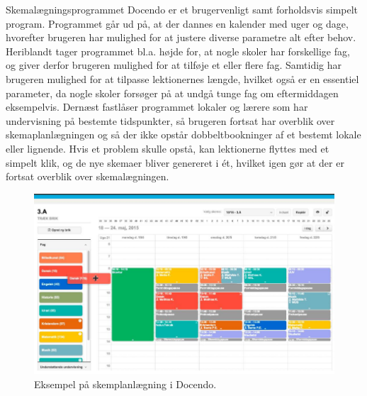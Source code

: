 Skemalægningsprogrammet Docendo er et brugervenligt samt forholdsvis simpelt program. Programmet går ud på, at der dannes en kalender med uger og dage, hvorefter brugeren har mulighed for at justere diverse parametre alt efter behov. Heriblandt tager programmet bl.a. højde for, at nogle skoler har forskellige fag, og giver derfor brugeren mulighed for at tilføje et eller flere fag. Samtidig har brugeren mulighed for at tilpasse lektionernes længde, hvilket også er en essentiel parameter, da nogle skoler forsøger på at undgå tunge fag om eftermiddagen eksempelvis. Dernæst fastlåser programmet lokaler og lærere som har undervisning på bestemte tidspunkter, så brugeren fortsat har overblik over skemaplanlægningen og så der ikke opstår dobbeltbookninger af et bestemt lokale eller lignende. Hvis et problem skulle opstå, kan lektionerne flyttes med et simpelt klik, og de nye skemaer bliver genereret i ét, hvilket igen gør at der er fortsat overblik over skemalægningen.
\begin{figure}[!h]
  \centering
  \includegraphics[width=\textwidth]{partials/graphics/docendo.png}
    \caption{Eksempel på skemplanlægning i Docendo.}
  \label{fig:docendo}
\end{figure}

